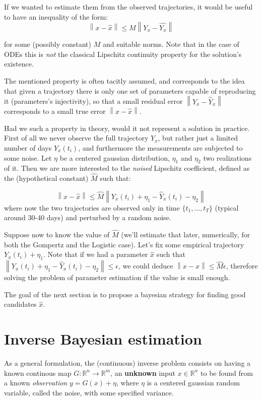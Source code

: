 \documentclass[6pt]{article}
\newcommand{\norm}[1]{\left\lVert#1\right\rVert}
\begin{document}
If we wanted to estimate them from the observed trajectories, 
it would be useful to have an inequality of the form:
\begin{equation}
\norm{ x - \hat{x} } \leq M \norm{Y_x - \hat{Y_x} }
\end{equation}

for some (possibly constant) $M$ and suitable norms.
Note that in the case of ODEs this is \emph{not} the classical
Lipschitz continuity property for the solution's existence.


The mentioned property is often tacitly assumed, and corresponds
to the idea that given a trajectory there is only one set of parameters
capable of reproducing it (parameters's injectivity), so that
a small residual error $\norm{Y_x - \hat{Y}_x}$ 
corresponds to a small true error $\norm{x - \hat{x}}$.


Had we such a property in theory, would it not represent
a solution in practice. First of all we never observe the full
trajectory $Y_x$, but rather just a limited number of days $Y_x(t_i)$,
and furthermore
the measurements are subjected to some noise. Let $\eta$ be a centered
gaussian distribution, $\eta_1$ and $\eta_2$ two realizations of it.
Then we are more interested to the \emph{noised} Lipschitz coefficient, 
defined as the (hypothetical constant) $\hat{M}$ such that:

\begin{equation}
\norm{ x - \hat{x} } \leq \hat{M} \norm 
	{Y_x(t_i) + \eta_1 - \hat{Y}_x(t_i) - \eta_2}
\end{equation}
where now the two trajectories are observed only in time
$\{t_1, \dots, t_T\} $ (typical around 30-40 days) and perturbed by a random
noise.


Suppose now to know the value of $\hat{M}$ (we'll estimate that
later, numerically, for both the Gompertz and the Logistic case).
Let's fix some empirical trajectory $Y_x(t_i) + \eta_1$.
Note that if we had a parameter $\hat{x}$ such that
$\norm{Y_x(t_i) + \eta_1 - \hat{Y}_x(t_i) - \eta_2} \leq \epsilon$,
we could deduce $\norm{ x - \hat{x} } \leq \hat{M} \epsilon$,
therefore solving the problem of parameter estimation if the
value is small enough.


The goal of the next section is to propose a bayesian strategy
for finding good candidates $\hat{x}$.

\section {Inverse Bayesian estimation}
As a general formulation, the (continuous) inverse problem 
consists on having a known continous map
$G: \mathbb{R}^n \to \mathbb{R}^m$, an \textbf{unknown} 
input $x \in \mathbb{R}^n$ to be found from
a known \emph{observation} $y = G(x) + \eta$, where $\eta$ is a centered
gaussian random variable, called the noise, with some specified variance.
\end{document}
